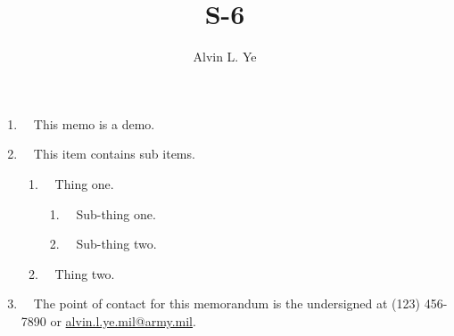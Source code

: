 \documentclass{armymemo}
\author{Alvin L. Ye}\rank{1LT}\branch{AV}\title{S-6}            %
\begin{document}
\begin{enumerate}
\item~~This memo is a demo.
\item~~This item contains sub items.
    \begin{enumerate}
    \item~~Thing one.
        \begin{enumerate}
        \item~~Sub-thing one.
        \item~~Sub-thing two.
        \end{enumerate}
    \item~~Thing two.
    \end{enumerate}
\item~~The point of contact for this memorandum is the undersigned at (123) 456-7890 or \href{mailto:alvin.l.ye.mil@army.mil}{alvin.l.ye.mil@army.mil}.
\end{enumerate}
\end{document}
